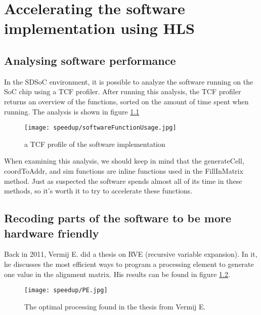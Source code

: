 
\chapter{Accelerating the software implementation using HLS}
\label{ch:HardwareImpl}

\section{Analysing software performance}

In the SDSoC environment, it is possible to analyze the software running on the SoC chip using a TCF profiler. After running this analysis, the TCF profiler returns an overview of the functions, sorted on the amount of time spent when running. The analysis is shown in figure \ref{fig:softwareFunctionUsage}

\begin{figure}[H]
	\centering
	\texttt{[image: speedup/softwareFunctionUsage.jpg]}
	\caption{a TCF profile of the software implementation}
	\label{fig:softwareFunctionUsage}
\end{figure}

When examining this analysis, we should keep in mind that the generateCell, coordToAddr, and sim functions are inline functions used in the FillInMatrix method. Just as suspected the software spends almost all of its time in these methods, so it's worth it to try to accelerate these functions.

\section{Recoding parts of the software to be more hardware friendly}

Back in 2011, Vermij E. did a thesis on RVE (recursive variable expansion). In it, he discusses the most efficient ways to program a processing element to generate one value in the alignment matrix. His results can be found in figure \ref{fig:PE}. 

\begin{figure}[H]
	\centering
	\texttt{[image: speedup/PE.jpg]}
	\caption{The optimal processing found in the thesis from Vermij E.}
	\label{fig:PE}
\end{figure}

